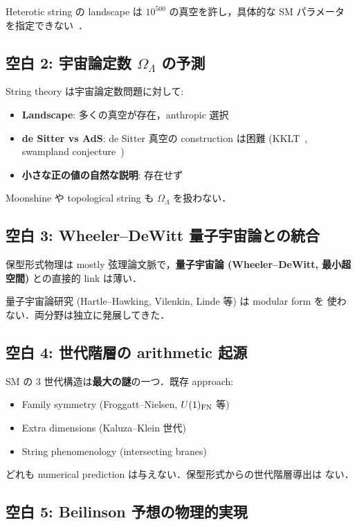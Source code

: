 \documentclass[11pt,a4paper]{article}
\begin{document}
Heterotic string の landscape は $10^{500}$ の真空を許し，具体的な
SM パラメータを指定できない~\cite{Susskind2003}．

\subsection{空白 2: 宇宙論定数 $\Omega_\Lambda$ の予測}

String theory は宇宙論定数問題に対して:
\begin{itemize}
\item \textbf{Landscape}: 多くの真空が存在，anthropic 選択~\cite{Weinberg1987}
\item \textbf{de Sitter vs AdS}: de Sitter 真空の construction は困難
(KKLT~\cite{KKLT2003}, swampland conjecture~\cite{Vafa2005})
\item \textbf{小さな正の値の自然な説明}: 存在せず
\end{itemize}

Moonshine や topological string も $\Omega_\Lambda$ を扱わない．

\subsection{空白 3: Wheeler--DeWitt 量子宇宙論との統合}

保型形式物理は mostly 弦理論文脈で，\textbf{量子宇宙論 (Wheeler--DeWitt,
最小超空間)} との直接的 link は薄い．

量子宇宙論研究 (Hartle--Hawking, Vilenkin, Linde 等) は modular form を
使わない．両分野は独立に発展してきた．

\subsection{空白 4: 世代階層の arithmetic 起源}

SM の 3 世代構造は\textbf{最大の謎}の一つ．既存 approach:
\begin{itemize}
\item Family symmetry (Froggatt--Nielsen, $U(1)_{\rm FN}$ 等)
\item Extra dimensions (Kaluza--Klein 世代)
\item String phenomenology (intersecting branes)
\end{itemize}

どれも numerical prediction は与えない．保型形式からの世代階層導出は
ない．

\subsection{空白 5: Beilinson 予想の物理的実現}
\end{document}
